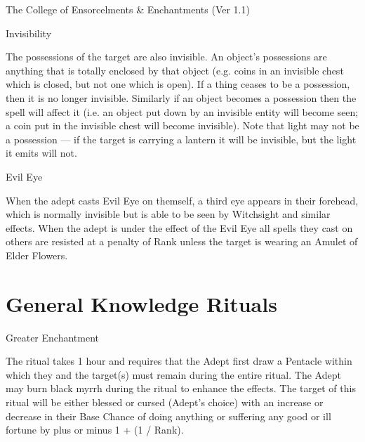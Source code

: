 \begin{Chapter}{The College of Ensorcelments \& Enchantments (Ver 1.1)}
\begin{spell}[G-8]{Invisibility}
\begin{effects}
The possessions of the target are also invisible. An object’s
possessions are anything that is totally enclosed by that object (e.g.
coins in an invisible chest which is closed, but not one which is
open).  If a thing ceases to be a possession, then it is no longer
invisible.  Similarly if an object becomes a possession then the spell
will affect it (i.e.  an object put down by an invisible entity will
become seen; a coin put in the invisible chest will become invisible).
Note that light may not be a possession — if the target is carrying a
lantern it will be invisible, but the light it emits will not.
\end{effects}
\end{spell}

\begin{spell}[G-9]{Evil Eye}

\begin{effects}
When the adept casts Evil Eye on themself, a third eye appears in
their forehead, which is normally invisible but is able to be seen by
Witchsight and similar effects.  When the adept is under the effect of
the Evil Eye all spells they cast on others are resisted at a penalty
of Rank unless the target is wearing an Amulet of Elder Flowers.
\end{effects}
\end{spell}

\section{General Knowledge Rituals}

\begin{ritual}[Q-1]{Greater Enchantment}

\begin{effects}
The ritual takes 1 hour and requires that the Adept first draw a
Pentacle within which they and the target(s) must remain during the
entire ritual. The Adept may burn black myrrh during the ritual to
enhance the effects.  The target of this ritual will be either blessed
or cursed (Adept’s choice) with an increase or decrease in their Base
Chance of doing anything or suffering any good or ill fortune by plus
or minus 1 + (1 / Rank).


\end{effects}
\end{ritual}
\end{Chapter}
